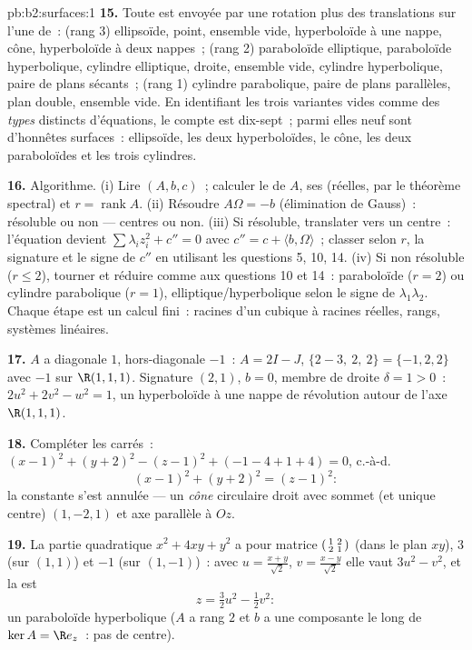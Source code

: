 \begin{solution}{pb:b2:surfaces:1}
\textbf{15.} Toute  est envoyée par une rotation plus des
translations sur l'une de~: (rang 3) ellipsoïde, point, ensemble
vide, hyperboloïde à une nappe, cône, hyperboloïde à deux nappes~;
(rang 2) paraboloïde elliptique, paraboloïde hyperbolique, cylindre
elliptique, droite, ensemble vide, cylindre hyperbolique, paire de plans
sécants~; (rang 1) cylindre parabolique, paire de plans parallèles, plan
double, ensemble vide. En identifiant les trois variantes vides comme des
\emph{types } distincts d'équations, le compte est dix-sept~; parmi
elles neuf sont d'honnêtes surfaces~: ellipsoïde, les deux hyperboloïdes,
le cône, les deux paraboloïdes et les trois cylindres.

\textbf{16.} Algorithme. (i) Lire $(A, b, c)$~; calculer le
 de $A$, ses  (réelles, par
le théorème spectral) et $r = \operatorname{rank}A$. (ii)
Résoudre $A\Omega = -b$ (élimination de Gauss)~: résoluble ou non
--- centres ou non. (iii) Si résoluble, translater vers un centre~:
l'équation devient $\sum\lambda_iz_i^2 + c'' = 0$ avec $c''
= c + \langle b, \Omega\rangle$~; classer selon $r$, la signature
et le signe de $c''$ en utilisant les questions 5, 10, 14. (iv) Si non
résoluble ($r \leq 2$), tourner et réduire comme aux questions 10
et 14~: paraboloïde ($r = 2$) ou cylindre parabolique ($r = 1$),
elliptique/hyperbolique selon le signe de
$\lambda_1\lambda_2$. Chaque étape est un calcul fini~: racines
d'un cubique à racines réelles, rangs, systèmes linéaires.

\textbf{17.} $A$ a diagonale $1$, hors-diagonale $-1$~: $A = 2I
- J$,  $\{2 - 3,\ 2,\ 2\} = \{-1, 2, 2\}$ avec $-1$
sur $\R(1,1,1)$. Signature $(2,1)$, $b = 0$, membre de droite
$\delta = 1 > 0$~: $2u^2 + 2v^2 - w^2 = 1$, un hyperboloïde à une
nappe de révolution autour de l'axe $\R(1,1,1)$.

\textbf{18.} Compléter les carrés~: $(x-1)^2 + (y+2)^2 - (z-1)^2 +
(-1 - 4 + 1 + 4) = 0$, c.-à-d.
\[
(x-1)^2 + (y+2)^2 = (z-1)^2 :
\]
la constante s'est annulée --- un \emph{cône} circulaire droit avec
sommet (et unique centre) $(1, -2, 1)$ et axe parallèle à
$Oz$.

\textbf{19.} La partie quadratique $x^2 + 4xy + y^2$ a pour matrice
$\begin{psmallmatrix}1 & 2\\ 2 & 1\end{psmallmatrix}$ (dans le
plan $xy$),  $3$ (sur $(1,1)$) et $-1$ (sur
$(1,-1)$)~: avec $u = \frac{x+y}{\sqrt2}$, $v =
\frac{x-y}{\sqrt2}$ elle vaut $3u^2 - v^2$, et la 
est
\[
z = \tfrac32u^2 - \tfrac12v^2 :
\]
un paraboloïde hyperbolique ($A$ a rang $2$ et $b$ a une
composante le long de $\ker A = \R e_z$~: pas de centre).


\end{solution}
